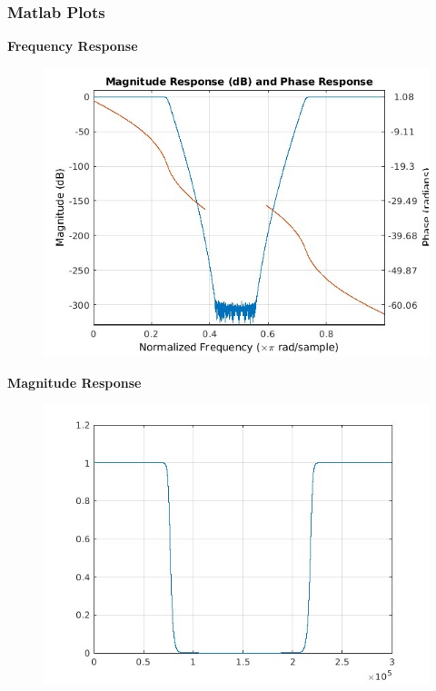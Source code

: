 \documentclass{article}
\begin{document}
\subsubsection{Matlab Plots}
\textbf{Frequency Response}
\begin{figure}[H]
\hspace*{-2.5cm}
    \centering
    \includegraphics[scale = 0.7]{Freq_resp_bsf.jpg}
    \label{fig:my_label}
\end{figure}

\textbf{Magnitude Response}
\begin{figure}[H]
\hspace*{-2.5cm}
    \centering
    \includegraphics[scale = 0.6]{mag_resp_bsf.jpg}
    \label{fig:my_label}
\end{figure}
\end{document}
